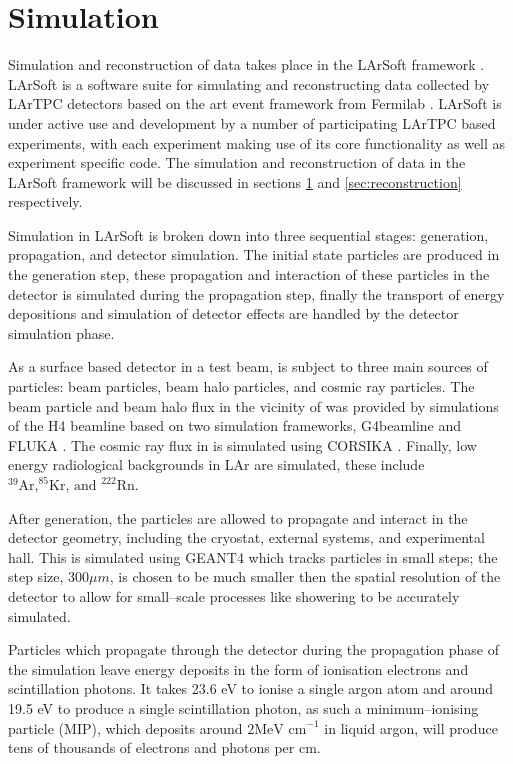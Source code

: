 \section{Simulation} \label{sec:simulation}

Simulation and reconstruction of \protodune{} data takes place in the LArSoft
framework \cite{Snider2017}. LArSoft is a software suite for simulating and
reconstructing data collected by LArTPC detectors based on the art event 
framework from Fermilab \cite{Green:2012gv}. LArSoft is under active use and
development by a number of participating LArTPC based experiments, with each
experiment making use of its core functionality as well as experiment specific
code. The simulation and reconstruction of \protodune{} data in the LArSoft
framework will be discussed in sections \ref{sec:simulation} and
\ref{sec:reconstruction} respectively.

Simulation in LArSoft is broken down into three sequential stages: generation,
propagation, and detector simulation. The initial state particles are produced
in the generation step, these propagation and interaction of these particles in
the detector is simulated during the propagation step, finally the transport of 
energy depositions and simulation of detector effects are handled by the
detector simulation phase.

As a surface based detector in a test beam, \protodune{} is subject to three
main sources of particles: beam particles, beam halo particles, and cosmic ray
particles. The beam particle and beam halo flux in the vicinity of 
\protodune{} was provided by simulations of the H4 beamline 
\cite{Booth:2019brj} based on two simulation frameworks, G4beamline 
\cite{g4beamline} and FLUKA \cite{BOHLEN2014211}. The cosmic ray flux in
\protodune{} is simulated using CORSIKA \cite{Heck:1998vt}. Finally, low energy 
radiological backgrounds in LAr are simulated, these include $^{39}\mbox{Ar,} ^
{85}\mbox{Kr, and } ^{222}\mbox{Rn}$.

After generation, the particles are allowed to propagate and interact in the 
detector geometry, including the cryostat, external systems, and experimental
hall. This is simulated using GEANT4 \cite{Agostinelli:2002hh} which tracks 
particles in small steps; the step size, $300 \mu m$, is chosen to be much 
smaller then the spatial resolution of the detector to allow for small--scale 
processes like showering to be accurately simulated. 

Particles which propagate through the detector during the propagation phase of
the simulation leave energy deposits in the form of ionisation electrons and
scintillation photons. It takes 23.6 eV to ionise a single argon atom and 
around 19.5 eV to produce a single scintillation photon, as such a 
minimum--ionising particle (MIP), which deposits around $2 \mbox{MeV cm}^{-1}$ 
in liquid argon, will produce tens of thousands of electrons and photons per cm.


